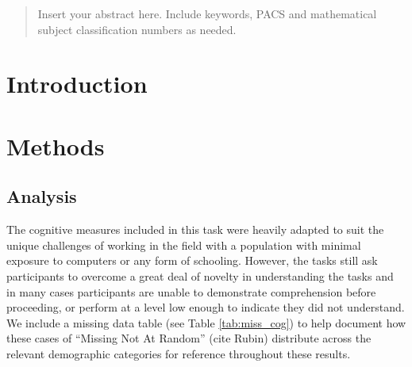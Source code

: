 \date{Received: date / Accepted: date}


\maketitle

\begin{abstract}
Insert your abstract here. Include keywords, PACS and mathematical
subject classification numbers as needed.
\end{abstract}

\section{Introduction}
\label{sec:1}

\section{Methods}
\label{sec:2}
	\subsection{Analysis}
	\label{sec:2.2}

The cognitive measures included in this task were heavily adapted to suit the unique challenges of working in the field with a population with minimal exposure to computers or any form of schooling.  However, the tasks still ask participants to overcome a great deal of novelty in understanding the tasks and in many cases participants are unable to demonstrate comprehension before proceeding, or perform at a level low enough to indicate they did not understand.  We include a missing data table (see Table \ref{tab:miss_cog})	to help document how these cases of ``Missing Not At Random'' (cite Rubin) distribute across the relevant demographic categories for reference throughout these results.

